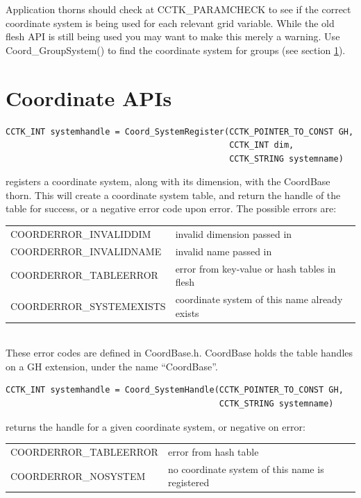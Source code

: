 Application thorns should check at CCTK\_PARAMCHECK to see if the correct
coordinate system is being used for each relevant grid variable.
While the old flesh API is still being used you may want to make this
merely a warning.
Use Coord\_GroupSystem() to find the coordinate system for groups (see
section \ref{CactusBase_CoordBase_APIs}).


\section{Coordinate APIs}
\label{CactusBase_CoordBase_APIs}

\begin{verbatim}
CCTK_INT systemhandle = Coord_SystemRegister(CCTK_POINTER_TO_CONST GH,
                                             CCTK_INT dim, 
                                             CCTK_STRING systemname)
\end{verbatim}
registers a coordinate system, along with its
dimension, with the CoordBase thorn.  This will create a coordinate
system table, and return the handle of the table for success, or a
negative error code upon error.  The possible errors are:\beforetable
\begin{tabular}{ll}
COORDERROR\_INVALIDDIM   & invalid dimension passed in\\
COORDERROR\_INVALIDNAME  & invalid name passed in\\
COORDERROR\_TABLEERROR   & error from key-value or hash tables in flesh\\
COORDERROR\_SYSTEMEXISTS & coordinate system of this name already exists\\
\end{tabular}
\\These error codes are defined in CoordBase.h.  CoordBase holds the
table handles on a GH extension, under the name ``CoordBase''.

\begin{verbatim}
CCTK_INT systemhandle = Coord_SystemHandle(CCTK_POINTER_TO_CONST GH,
                                           CCTK_STRING systemname)
\end{verbatim}
returns the handle for a given coordinate system, or 
negative on error:\beforetable
\begin{tabular}{ll}
   COORDERROR\_TABLEERROR &  error from hash table\\
   COORDERROR\_NOSYSTEM   &  no coordinate system of this name is registered\\
\end{tabular}

